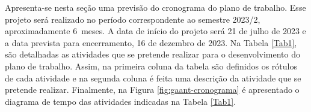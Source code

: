 \newcommand{\DuracionPlanoMeses}{6}

\newcommand{\AtvAlgRotI}{Revisão bibliográfica}
\newcommand{\AtvAlgRotII}{Criar e configurar uma plataforma para computação em borda e em nuvem}
\newcommand{\AtvAlgRotIII}{Instalar as aplicações de suporte ao PIS}
\newcommand{\AtvAlgRotIV}{Adaptação das aplicações do sistema}
\newcommand{\AtvAlgRotV}{Desenvolvimento de um controlador para realizar o gerenciamento das aplicações}
\newcommand{\AtvAlgRotVI}{Validação do controlador desenvolvido}
\newcommand{\AtvAlgRotVII}{Redação do projeto de graduação}
\newcommand{\AtvAlgRotVIII}{Revisão do projeto de graduação}
\newcommand{\AtvAlgRotIX}{Defesa do projeto de graduação}


\newcommand{\RTLAtvAlgRotI}{ATV 1} %
\newcommand{\RTLAtvAlgRotII}{ATV 2} %
\newcommand{\RTLAtvAlgRotIII}{ATV 3} %
\newcommand{\RTLAtvAlgRotIV}{ATV 4} %
\newcommand{\RTLAtvAlgRotV}{ATV 5} %
\newcommand{\RTLAtvAlgRotVI}{ATV 6} %
\newcommand{\RTLAtvAlgRotVII}{ATV 7} %
\newcommand{\RTLAtvAlgRotVIII}{ATV 8} %
\newcommand{\RTLAtvAlgRotIX}{ATV 9} %


Apresenta-se nesta seção uma previsão do cronograma do plano de trabalho. Esse projeto será realizado no período correspondente ao semestre 2023/2, aproximadamente \DuracionPlanoMeses\ meses. A data de início do projeto será 21 de julho de 2023 e a data prevista para encerramento, 16 de dezembro de 2023. Na Tabela \ref{Tab1}, são detalhadas as atividades que se pretende realizar para o desenvolvimento do plano de trabalho. Assim, na primeira coluna da tabela são definidos os rótulos de cada atividade e na segunda coluna é feita uma descrição da atividade que se pretende realizar. Finalmente, na Figura \ref{fig:gaant-cronograma} é apresentado o diagrama de tempo das atividades indicadas na Tabela \ref{Tab1}.



